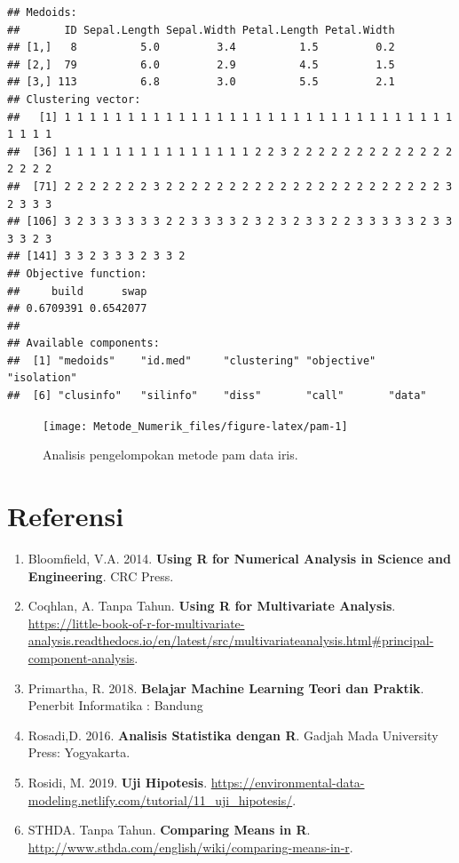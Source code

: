 \documentclass[]{book}
\providecommand{\tightlist}{%
  \setlength{\itemsep}{0pt}\setlength{\parskip}{0pt}}
\theoremstyle{definition}
\theoremstyle{definition}
\theoremstyle{definition}
\theoremstyle{remark}
\begin{document}
\begin{verbatim}
## Medoids:
##       ID Sepal.Length Sepal.Width Petal.Length Petal.Width
## [1,]   8          5.0         3.4          1.5         0.2
## [2,]  79          6.0         2.9          4.5         1.5
## [3,] 113          6.8         3.0          5.5         2.1
## Clustering vector:
##   [1] 1 1 1 1 1 1 1 1 1 1 1 1 1 1 1 1 1 1 1 1 1 1 1 1 1 1 1 1 1 1 1 1 1 1 1
##  [36] 1 1 1 1 1 1 1 1 1 1 1 1 1 1 1 2 2 3 2 2 2 2 2 2 2 2 2 2 2 2 2 2 2 2 2
##  [71] 2 2 2 2 2 2 2 3 2 2 2 2 2 2 2 2 2 2 2 2 2 2 2 2 2 2 2 2 2 2 3 2 3 3 3
## [106] 3 2 3 3 3 3 3 3 2 2 3 3 3 3 2 3 2 3 2 3 3 2 2 3 3 3 3 3 2 3 3 3 3 2 3
## [141] 3 3 2 3 3 3 2 3 3 2
## Objective function:
##     build      swap 
## 0.6709391 0.6542077 
## 
## Available components:
##  [1] "medoids"    "id.med"     "clustering" "objective"  "isolation" 
##  [6] "clusinfo"   "silinfo"    "diss"       "call"       "data"
\end{verbatim}

\begin{figure}

{\centering \texttt{[image: Metode\_Numerik\_files/figure-latex/pam-1]} 

}

\caption{Analisis pengelompokan metode pam data iris.}\label{fig:pam}
\end{figure}

\hypertarget{referensi-9}{%
\section{Referensi}\label{referensi-9}}

\begin{enumerate}
\def\labelenumi{\arabic{enumi}.}
\tightlist
\item
  Bloomfield, V.A. 2014. \textbf{Using R for Numerical Analysis in Science and Engineering}. CRC Press.
\item
  Coqhlan, A. Tanpa Tahun. \textbf{Using R for Multivariate Analysis}. \url{https://little-book-of-r-for-multivariate-analysis.readthedocs.io/en/latest/src/multivariateanalysis.html\#principal-component-analysis}.
\item
  Primartha, R. 2018. \textbf{Belajar Machine Learning Teori dan Praktik}. Penerbit Informatika : Bandung
\item
  Rosadi,D. 2016. \textbf{Analisis Statistika dengan R}. Gadjah Mada University Press: Yogyakarta.
\item
  Rosidi, M. 2019. \textbf{Uji Hipotesis}. \url{https://environmental-data-modeling.netlify.com/tutorial/11_uji_hipotesis/}.
\item
  STHDA. Tanpa Tahun. \textbf{Comparing Means in R}. \url{http://www.sthda.com/english/wiki/comparing-means-in-r}.
\end{enumerate}
\end{document}
